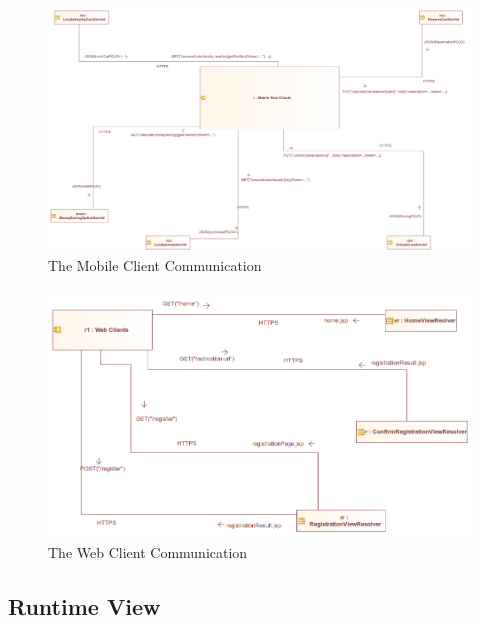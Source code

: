\documentclass[12pt]{article}
\begin{document}
\begin{figure}[h]
	\centering
	\includegraphics[width=\textwidth]{../Images/MobileClient_SecuredCommunication}
	\caption{The Mobile Client Communication}
\end{figure}

\begin{figure}[h]
	\centering
	\includegraphics[width=\textwidth]{../Images/WebClient_Communication}
	\caption{The Web Client Communication}
\end{figure}
\clearpage

\subsection{Runtime View}
\end{document}
